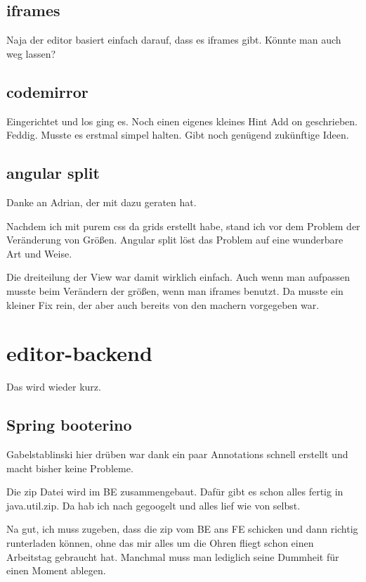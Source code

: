 \subsection{iframes}\label{subsec:iframes}
Naja der editor basiert einfach darauf, dass es iframes gibt.
Könnte man auch weg lassen?

\subsection{codemirror}\label{subsec:codemirror}
Eingerichtet und los ging es.
Noch einen eigenes kleines Hint Add on geschrieben.
Feddig.
Musste es erstmal simpel halten.
Gibt noch genügend zukünftige Ideen.

\subsection{angular split}\label{subsec:angular-split}
Danke an Adrian, der mit dazu geraten hat.

Nachdem ich mit purem css da grids erstellt habe, stand ich vor dem Problem der Veränderung von Größen.
Angular split löst das Problem auf eine wunderbare Art und Weise.

Die dreiteilung der View war damit wirklich einfach.
Auch wenn man aufpassen musste beim Verändern der größen, wenn man iframes benutzt.
Da musste ein kleiner Fix rein, der aber auch bereits von den machern vorgegeben war.

\section{editor-backend}\label{sec:editor-backend}
Das wird wieder kurz.

\subsection{Spring booterino}\label{subsec:spring-booterino}
Gabelstablinski hier drüben war dank ein paar Annotations schnell erstellt und macht bisher keine Probleme.

Die zip Datei wird im BE zusammengebaut.
Dafür gibt es schon alles fertig in java.util.zip.
Da hab ich nach gegoogelt und alles lief wie von selbst.

Na gut, ich muss zugeben, dass die zip vom BE ans FE schicken und dann richtig runterladen können,
ohne das mir alles um die Ohren fliegt schon einen Arbeitstag gebraucht hat.
Manchmal muss man lediglich seine Dummheit für einen Moment ablegen.
